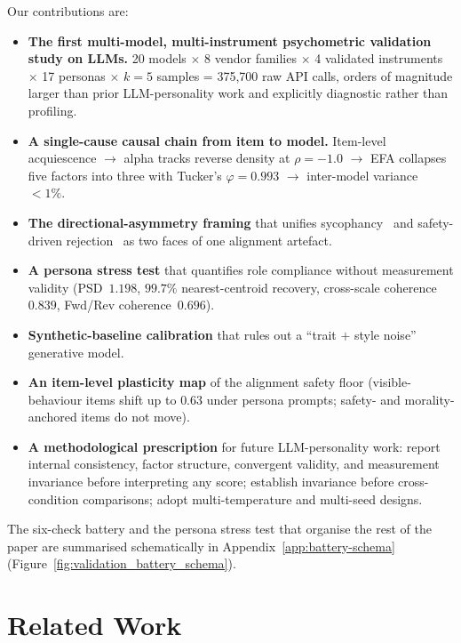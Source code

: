 \documentclass[11pt]{article}
\begin{document}
Our contributions are:
\begin{itemize}\setlength\itemsep{0pt}
  \item \textbf{The first multi-model, multi-instrument psychometric validation study on LLMs.} 20 models $\times$ 8 vendor families $\times$ 4 validated instruments $\times$ 17 personas $\times$ $k=5$ samples = 375{,}700 raw API calls, orders of magnitude larger than prior LLM-personality work and explicitly diagnostic rather than profiling.
  \item \textbf{A single-cause causal chain from item to model.} Item-level acquiescence $\rightarrow$ alpha tracks reverse density at $\rho=-1.0$ $\rightarrow$ EFA collapses five factors into three with Tucker's $\varphi=0.993$ $\rightarrow$ inter-model variance $<1\%$.
  \item \textbf{The directional-asymmetry framing} that unifies sycophancy~\citep{perez2023discovering,sharma2024sycophancy} and safety-driven rejection~\citep{bai2022constitutional} as two faces of one alignment artefact.
  \item \textbf{A persona stress test} that quantifies role compliance without measurement validity (PSD~$1.198$, $99.7\%$ nearest-centroid recovery, cross-scale coherence~$0.839$, Fwd/Rev coherence~$0.696$).
  \item \textbf{Synthetic-baseline calibration} that rules out a ``trait $+$ style noise'' generative model.
  \item \textbf{An item-level plasticity map} of the alignment safety floor (visible-behaviour items shift up to $0.63$ under persona prompts; safety- and morality-anchored items do not move).
  \item \textbf{A methodological prescription} for future LLM-personality work: report internal consistency, factor structure, convergent validity, and measurement invariance before interpreting any score; establish invariance before cross-condition comparisons; adopt multi-temperature and multi-seed designs.
\end{itemize}

\noindent The six-check battery and the persona stress test that organise the rest of the paper are summarised schematically in Appendix~\ref{app:battery-schema} (Figure~\ref{fig:validation_battery_schema}).

\section{Related Work}
\label{sec:related}
\end{document}
